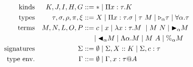 {%
\begin{align*}
    \textrm{kinds}             &  & K,J,I,H,G                & ::= * \mid \Pi x:\tau.K                                                           \\
    \textrm{types}             &  & \tau,\sigma,\rho,\pi,\xi & ::= X \mid \Pi x:\tau.\sigma \mid \tau\ M \mid {\mathop{\triangleright}}_{\alpha} \tau \mid \forall\alpha.\tau \\
    \textrm{terms}             &  & M,N,L,O,P                & ::= c \mid x \mid \lambda x:\tau.M\ \mid M\ N \mid {\mathop{\blacktriangleright}}_\alpha M                   \\
                               &  &                          & \ \ \ \ \mid {\mathop{\blacktriangleleft}}_\alpha M \mid \Lambda\alpha.M \mid M\ A \mid \%_\alpha M        \\
    \textrm{signatures}         &  & \Sigma                   & ::= \emptyset \mid \Sigma, X::K \mid \Sigma, c:\tau                               \\
    \textrm{type env.} &  & \Gamma                   & ::= \emptyset \mid  \Gamma,x:\tau @A                                              \\
\end{align*}
}


